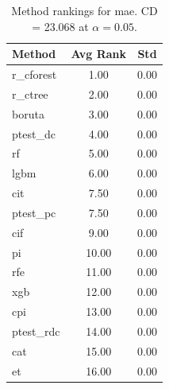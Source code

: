 \begin{table}[h]
\centering
\caption{Method rankings for mae. CD = 23.068 at $\alpha=0.05$.}
\label{tab:ranks_mae}
\begin{tabular}{lcc}
\toprule
Method & Avg Rank & Std \\
\midrule
r_cforest & 1.00 & 0.00 \\
r_ctree & 2.00 & 0.00 \\
boruta & 3.00 & 0.00 \\
ptest_dc & 4.00 & 0.00 \\
rf & 5.00 & 0.00 \\
lgbm & 6.00 & 0.00 \\
cit & 7.50 & 0.00 \\
ptest_pc & 7.50 & 0.00 \\
cif & 9.00 & 0.00 \\
pi & 10.00 & 0.00 \\
rfe & 11.00 & 0.00 \\
xgb & 12.00 & 0.00 \\
cpi & 13.00 & 0.00 \\
ptest_rdc & 14.00 & 0.00 \\
cat & 15.00 & 0.00 \\
et & 16.00 & 0.00 \\
\bottomrule
\end{tabular}
\end{table}